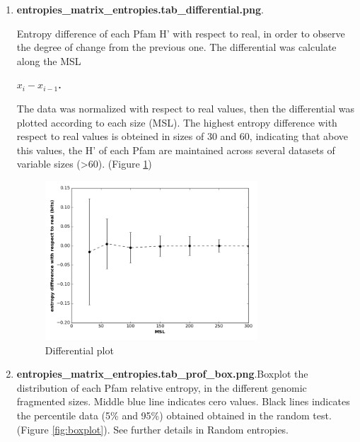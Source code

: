 \documentclass[12pt]{report}
\begin{document}
\begin{enumerate}
\begin{enumerate}
\item \textbf{entropies\_matrix\_entropies.tab\_differential.png}.

Entropy difference of each Pfam H' with respect to real, in order to observe
the degree of change from the previous one. The differential was calculate
along the MSL 

                      \textbf{          $x_i - x_{i-1}$.}

The data was normalized with respect to real values, then the differential was
plotted according to each size (MSL). The highest entropy difference with
respect to real values is obteined in sizes of 30 and 60, indicating that above
this values, the H' of each Pfam are maintained across several datasets of
variable sizes (>60). (Figure \ref{fig:differential})

 \begin{figure}[H]
  \centering
    \includegraphics[width=300px, scale =0.5]{entropies_matrix_entropies_tab_differential.png}
    \caption{Differential plot }
        \label{fig:differential}
\end{figure}

\item \textbf{entropies\_matrix\_entropies.tab\_prof\_box.png}.Boxplot the
distribution of each Pfam relative entropy, in the different genomic fragmented
sizes. Middle blue line indicates cero values. Black lines indicates the
percentile data  (5\% and 95\%) obtained obtained in the random test. (Figure
\ref{fig:boxplot}). See further details in Random entropies.  


\end{enumerate}
\end{enumerate}
\end{document}
